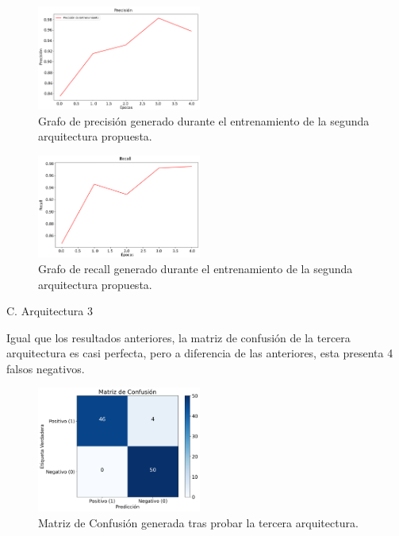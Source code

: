 \documentclass[conference, spanish, english]{IEEEtran}
\begin{document}
\begin{figure}[H]
\centering
\includegraphics[width=0.48\textwidth]{training_plots/plot_architecture_3/precision_plot.png}
\caption{Grafo de precisión generado durante el entrenamiento de la segunda arquitectura propuesta.}
\label{fig:precisionArqui2}
\end{figure}


\begin{figure}[H]
\centering
\includegraphics[width=0.48\textwidth]{training_plots/plot_architecture_3/recall_plot.png}
\caption{Grafo de recall generado durante el entrenamiento de la segunda arquitectura propuesta.}
\label{fig:recallArqui2}
\end{figure}

\begin{center}
    C. Arquitectura 3
\end{center}

Igual que los resultados anteriores, la matriz de confusión de la tercera arquitectura es casi perfecta, pero a diferencia de las anteriores, esta presenta 4 falsos negativos. 

\begin{figure}[H]
\centering
\includegraphics[width=0.48\textwidth]{training_plots/plot_architecture_4/confusion_matrix.png}
\caption{Matriz de Confusión generada tras probar la tercera arquitectura.}
\label{fig:MatrizArqui4}
\end{figure}
\end{document}
